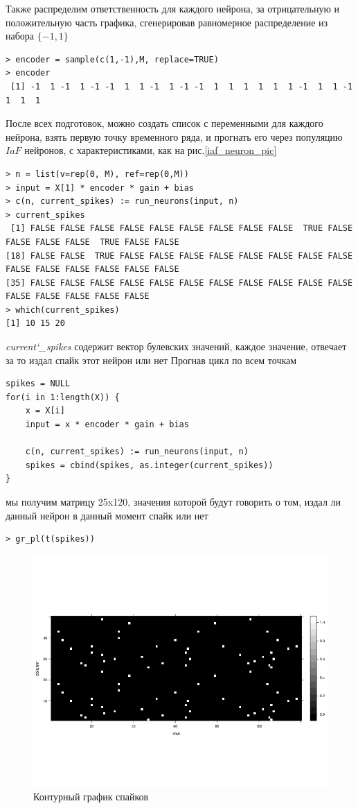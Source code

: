 \documentclass[a4paper,10pt,usenames]{article}
\begin{document}
\indent Также распределим ответственность для каждого нейрона, за отрицательную и положительную часть графика, сгенерировав равномерное распределение из набора $\{-1,1\}$\\
\begin{lstlisting}
> encoder = sample(c(1,-1),M, replace=TRUE)
> encoder 
 [1] -1  1 -1  1 -1 -1  1  1 -1  1 -1 -1  1  1  1  1  1  1 -1  1  1 -1  1  1  1
\end{lstlisting}
\indent После всех подготовок, можно создать список с переменными для каждого нейрона, взять первую точку временного ряда, и прогнать его через популяцию $IaF$ нейронов, с характеристиками, как на рис.\ref{iaf_neuron_pic}
\begin{lstlisting}
> n = list(v=rep(0, M), ref=rep(0,M))
> input = X[1] * encoder * gain + bias
> c(n, current_spikes) := run_neurons(input, n)
> current_spikes
 [1] FALSE FALSE FALSE FALSE FALSE FALSE FALSE FALSE FALSE  TRUE FALSE FALSE FALSE FALSE  TRUE FALSE FALSE
[18] FALSE FALSE  TRUE FALSE FALSE FALSE FALSE FALSE FALSE FALSE FALSE FALSE FALSE FALSE FALSE FALSE FALSE
[35] FALSE FALSE FALSE FALSE FALSE FALSE FALSE FALSE FALSE FALSE FALSE FALSE FALSE FALSE FALSE FALSE
> which(current_spikes)
[1] 10 15 20
\end{lstlisting}
\textit{current\char`_spikes} содержит вектор булевских значений, каждое значение, отвечает за то издал спайк этот нейрон или нет
\clearpage
Прогнав цикл по всем точкам
\begin{lstlisting}
spikes = NULL
for(i in 1:length(X)) {
    x = X[i]
    input = x * encoder * gain + bias
    
    c(n, current_spikes) := run_neurons(input, n)
    spikes = cbind(spikes, as.integer(current_spikes))    
}
\end{lstlisting}
мы получим матрицу 25x120, значения которой будут говорить о том, издал ли данный нейрон в данный момент спайк или нет
\begin{lstlisting}
> gr_pl(t(spikes))
\end{lstlisting}
\begin{figure}[ht]
\centering
\captionsetup{justification=centering,margin=1cm}
\includegraphics[width=120mm,scale=1]{rastr_plot.png}
\caption{Контурный график спайков}
\label{rastr}
\end{figure}
\end{document}
